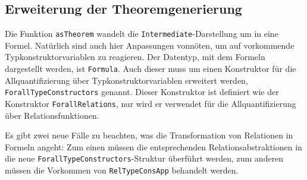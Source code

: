 



\subsection{Erweiterung der Theoremgenerierung}

Die Funktion \texttt{asTheorem} wandelt die \texttt{Intermediate}-Darstellung um in eine Formel. Natürlich sind auch hier
Anpassungen vonnöten, um auf vorkommende Typkonstruktorvariablen zu reagieren. Der Datentyp, mit dem Formeln
dargestellt werden, ist \texttt{Formula}. Auch dieser muss um einen Konstruktor für die Allquantifizierung über
Typkonstruktorvariablen erweitert werden, \texttt{ForallTypeConstructors} genannt.
Dieser Konstruktor ist definiert wie der Konstruktor \texttt{ForallRelations}, nur wird er verwendet für die Allquantifizierung
über Relationsfunktionen.

Es gibt zwei neue Fälle zu beachten, was die Transformation von Relationen in Formeln angeht: Zum einen müssen die
entsprechenden Relationsabstraktionen in die neue \texttt{ForallTypeConstructors}-Struktur überführt werden, zum anderen
müssen die Vorkommen von \texttt{RelTypeConsApp} behandelt werden.

